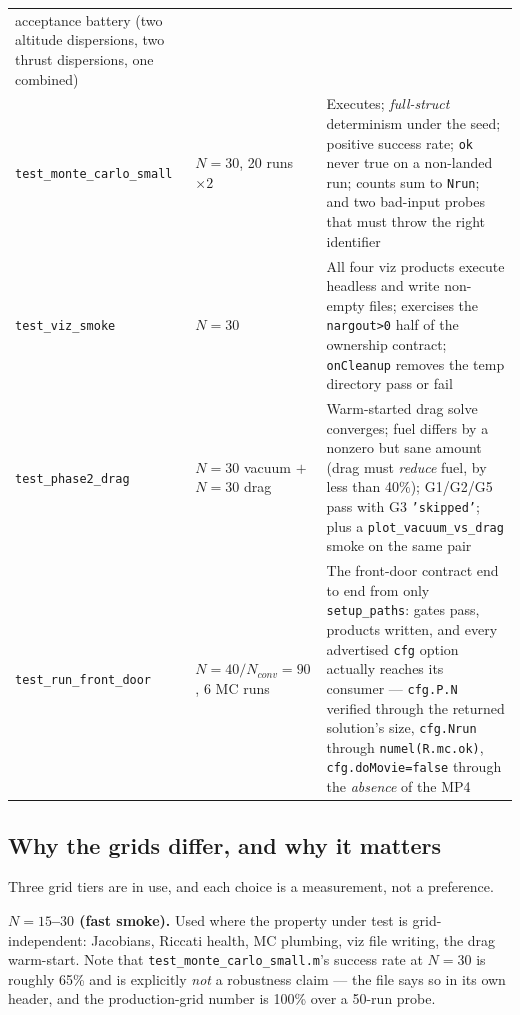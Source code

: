 \documentclass[11pt]{article}
\newcommand{\file}[1]{\texttt{#1}}
\begin{document}
\begin{center}
\begin{longtable}{@{}lL{3.2cm}L{5.9cm}@{}}
acceptance battery (two altitude dispersions, two thrust dispersions, one
combined) \\
\texttt{test\_monte\_carlo\_small} & $N=30$, 20 runs $\times2$ &
Executes; \emph{full-struct} determinism under the seed; positive success
rate; \texttt{ok} never true on a non-landed run; counts sum to
\texttt{Nrun}; and two bad-input probes that must throw the right identifier \\
\texttt{test\_viz\_smoke} & $N=30$ &
All four viz products execute headless and write non-empty files; exercises
the \texttt{nargout>0} half of the ownership contract; \texttt{onCleanup}
removes the temp directory pass or fail \\
\texttt{test\_phase2\_drag} & $N=30$ vacuum $+$ $N=30$ drag &
Warm-started drag solve converges; fuel differs by a nonzero but sane amount
(drag must \emph{reduce} fuel, by less than 40\%); G1/G2/G5 pass with G3
\texttt{'skipped'}; plus a \texttt{plot\_vacuum\_vs\_drag} smoke on the same
pair \\
\texttt{test\_run\_front\_door} & $N{=}40/N_{conv}{=}90$,
6 MC runs &
The front-door contract end to end from only \texttt{setup\_paths}: gates
pass, products written, and every advertised \texttt{cfg} option actually
reaches its consumer --- \texttt{cfg.P.N} verified through the returned
solution's size, \texttt{cfg.Nrun} through \texttt{numel(R.mc.ok)},
\texttt{cfg.doMovie=false} through the \emph{absence} of the MP4 \\
\bottomrule
\end{longtable}
\end{center}

\subsection{Why the grids differ, and why it matters}
\label{sec:tests:grids}

Three grid tiers are in use, and each choice is a measurement, not a
preference.

\textbf{$N=15$--$30$ (fast smoke).} Used where the property under test is
grid-independent: Jacobians, Riccati health, MC plumbing, viz file writing,
the drag warm-start. Note that \file{test\_monte\_carlo\_small.m}'s success
rate at $N=30$ is roughly 65\% and is explicitly \emph{not} a robustness
claim --- the file says so in its own header, and the production-grid number
is 100\% over a 50-run probe.
\end{document}
